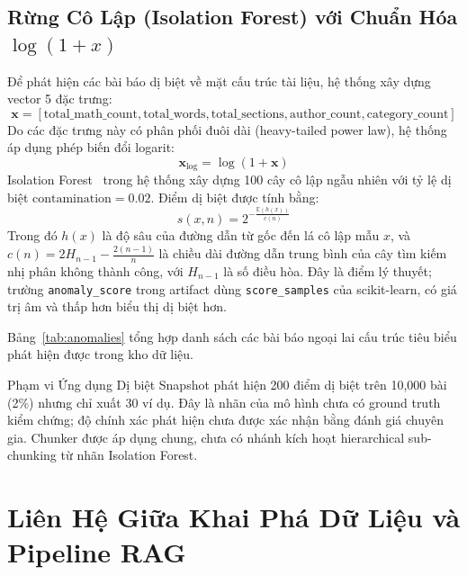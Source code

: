 \subsection{Rừng Cô Lập (Isolation Forest) với Chuẩn Hóa $\log(1+x)$}
Để phát hiện các bài báo dị biệt về mặt cấu trúc tài liệu, hệ thống xây dựng vector 5 đặc trưng:
\begin{equation}
  \mathbf{x} = [\text{total\_math\_count}, \text{total\_words}, \text{total\_sections}, \text{author\_count}, \text{category\_count}]
\end{equation}
Do các đặc trưng này có phân phối đuôi dài (heavy-tailed power law), hệ thống áp dụng phép biến đổi logarit:
\begin{equation}
  \mathbf{x}_{\text{log}} = \log(1 + \mathbf{x})
\end{equation}
Isolation Forest~\cite{liu2008isolation} trong hệ thống xây dựng 100 cây cô lập ngẫu nhiên với tỷ lệ dị biệt $\text{contamination} = 0.02$. Điểm dị biệt được tính bằng:
\begin{equation}
  s(x, n) = 2^{-\frac{\mathbb{E}(h(x))}{c(n)}}
\end{equation}
Trong đó $h(x)$ là độ sâu của đường dẫn từ gốc đến lá cô lập mẫu $x$, và $c(n) = 2H_{n-1} - \frac{2(n-1)}{n}$ là chiều dài đường dẫn trung bình của cây tìm kiếm nhị phân không thành công, với $H_{n-1}$ là số điều hòa. Đây là điểm lý thuyết; trường \texttt{anomaly\_score} trong artifact dùng \texttt{score\_samples} của scikit-learn, có giá trị âm và thấp hơn biểu thị dị biệt hơn.

Bảng~\ref{tab:anomalies} tổng hợp danh sách các bài báo ngoại lai cấu trúc tiêu biểu phát hiện được trong kho dữ liệu.



\begin{calloutbox}{Phạm vi Ứng dụng Dị biệt}
Snapshot phát hiện 200 điểm dị biệt trên 10,000 bài (2\%) nhưng chỉ xuất 30 ví dụ. Đây là nhãn của mô hình chưa có ground truth kiểm chứng; độ chính xác phát hiện chưa được xác nhận bằng đánh giá chuyên gia. Chunker được áp dụng chung, chưa có nhánh kích hoạt hierarchical sub-chunking từ nhãn Isolation Forest.
\end{calloutbox}

\FloatBarrier
\section{Liên Hệ Giữa Khai Phá Dữ Liệu và Pipeline RAG}

